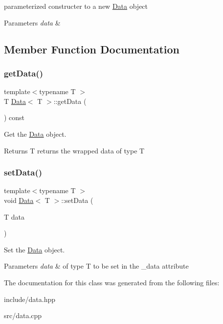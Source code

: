 parameterized constructer to a new \hyperlink{classData}{Data} object 


\begin{DoxyParams}{Parameters}
{\em data} & \\
\hline
\end{DoxyParams}


\subsection{Member Function Documentation}
\mbox{\label{classData_a1c956c4d07da4ff318f17811254ec7e5}} 
\subsubsection{\texorpdfstring{get\+Data()}{getData()}}
{\footnotesize\ttfamily template$<$typename T $>$ \\
T \hyperlink{classData}{Data}$<$ T $>$\+::get\+Data (\begin{DoxyParamCaption}{ }\end{DoxyParamCaption}) const\hspace{0.3cm}{\ttfamily [virtual]}}



Get the \hyperlink{classData}{Data} object. 

\begin{DoxyReturn}{Returns}
T returns the wrapped data of type T 
\end{DoxyReturn}
\mbox{\label{classData_a08197cc91bb861231a63f409e6b60f44}} 
\subsubsection{\texorpdfstring{set\+Data()}{setData()}}
{\footnotesize\ttfamily template$<$typename T $>$ \\
void \hyperlink{classData}{Data}$<$ T $>$\+::set\+Data (\begin{DoxyParamCaption}\item[{T}]{data }\end{DoxyParamCaption})\hspace{0.3cm}{\ttfamily [virtual]}}



Set the \hyperlink{classData}{Data} object. 


\begin{DoxyParams}{Parameters}
{\em data} & of type T to be set in the \+\_\+data attribute \\
\hline
\end{DoxyParams}


The documentation for this class was generated from the following files\+:\begin{DoxyCompactItemize}
\item 
include/data.\+hpp\item 
src/data.\+cpp\end{DoxyCompactItemize}
